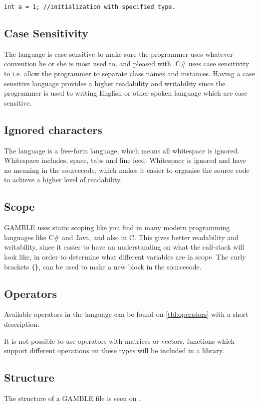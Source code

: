 \begin{lstlisting}[caption={Comment and Semicolon},label={lst:CommSemi}]
int a = 1; //initialization with specified type.
\end{lstlisting}

\subsection*{Case Sensitivity}
The language is case sensitive to make sure the programmer uses whatever convention he or she is most used to, and pleased with.
C\# uses case sensitivity to i.e. allow the programmer to separate class names and instances.
Having a case sensitive language provides a higher readability and writability since the programmer is used to writing English or other spoken language which are case sensitive.

\subsection*{Ignored characters}
The language is a free-form language, which means all whitespace is ignored.
Whitespace includes, space, tabs and line feed.
Whitespace is ignored and have no meaning in the sourcecode, which makes it easier to organise the source code to achieve a higher level of readability.

\subsection*{Scope}
GAMBLE uses static scoping like you find in many modern programming languages like C\# and Java, and also in C.
This gives better readability and writability, since it easier to have an understanding on what the call-stack will look like, in order to determine what different variables are in scope.
The curly brackets \texttt{\{\}}, can be used to make a new block in the sourcecode.

\subsection*{Operators}
Available operators in the language can be found on \ref{tbl:operators} with a short description.
  
It is not possible to use operators with matrices or vectors, functions which support different operations on these types will be included in a library.

\subsection*{Structure} 
The structure of a GAMBLE file is seen on .

